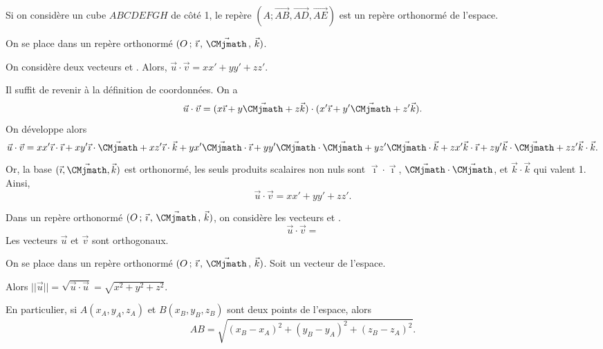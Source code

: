 \documentclass[11pt,fleqn, openany]{book} %
\begin{document}
\begin{example} Si on considère un cube $ABCDEFGH$ de côté 1, le repère $(A;\overrightarrow{AB},\overrightarrow{AD}, \overrightarrow{AE})$ est un repère orthonormé de l'espace.\end{example}

\begin{proposition}On se place dans un repère orthonormé $\Oijk$. 

On considère deux vecteurs \renewcommand{\arraystretch}{1} et \renewcommand{\arraystretch}{1}. Alors, $\vec u \cdot \vec v =xx'+yy'+zz'$.\end{proposition}

\begin{demonstration} Il suffit de revenir à la définition de coordonnées. On a
\[ \vec u \cdot \vec v = (x\vec{\imath} + y \vec{\CMjmath} + z \vec k) \cdot (x' \vec{\imath} + y' \vec{\CMjmath} + z' \vec k).\]
On développe alors
\[ \vec u \cdot \vec v = xx' \vec{\imath} \cdot \vec{\imath} +  xy' \vec{\imath} \cdot \vec{\CMjmath} +  xz' \vec{\imath} \cdot \vec k +  yx' \vec{\CMjmath} \cdot \vec{\imath} +  yy' \vec{\CMjmath} \cdot \vec{\CMjmath} +  yz' \vec{\CMjmath} \cdot \vec k +  zx' \vec k \cdot \vec{\imath} +  zy' \vec k \cdot \vec{\CMjmath} +  zz' \vec k \cdot \vec k .\]
Or, la base $(\vec{\imath}, \vec{\CMjmath}, \vec k)$ est orthonormé, les seuls produits scalaires non nuls sont $\vec{\imath} \cdot \vec{\imath}$, $\vec{\CMjmath} \cdot \vec{\CMjmath}$, et $\vec k \cdot \vec k$ qui valent 1. Ainsi, 
\[ \vec u \cdot \vec v =xx'+yy'+zz'.\]\vspace{-0.5cm}\end{demonstration}

\begin{example} Dans un repère orthonormé $\Oijk$, on considère les vecteurs \renewcommand{\arraystretch}{1} et \renewcommand{\arraystretch}{1}.
\[ \vec u \cdot \vec v = \]
Les vecteurs $\vec u$ et $\vec v$ sont orthogonaux.\end{example}

\begin{proposition} On se place dans un repère orthonormé $\Oijk$. Soit \renewcommand{\arraystretch}{1} un vecteur de l'espace. 

Alors $ \lvert\lvert\vec u\rvert\rvert = \sqrt{ \vec u \cdot \vec u} =  \sqrt{x^2+y^2+z^2}$.

En particulier, si $A(x_A,y_A,z_A)$ et $B(x_B, y_B, z_B)$ sont deux points de l'espace, alors
\[ AB = \sqrt{(x_B-x_A)^2+(y_B-y_A)^2+(z_B-z_A)^2} .\]\end{proposition}
\end{document}
